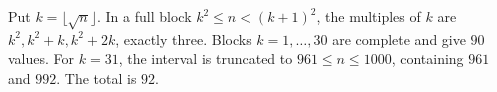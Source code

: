 Put $k=\lfloor\sqrt n\rfloor$. In a full block $k^2\le n<(k+1)^2$, the multiples of $k$ are $k^2,k^2+k,k^2+2k$, exactly three. Blocks $k=1,\ldots,30$ are complete and give $90$ values. For $k=31$, the interval is truncated to $961\le n\le 1000$, containing $961$ and $992$. The total is $\boxed{92}$.
